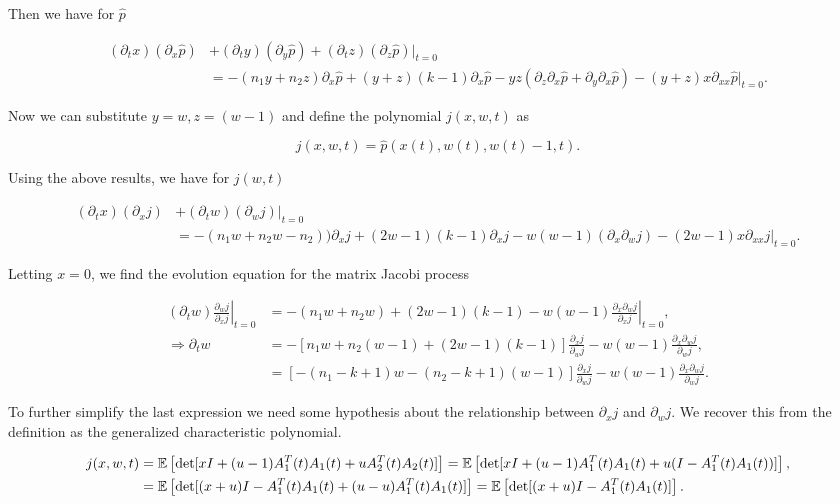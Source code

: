     Then we have for $\hat p$

    \begin{align*}
        (\partial_t x)(\partial_x \hat p) &+ (\partial_t y)(\partial_y \hat p) + (\partial_t z)(\partial_z \hat p)|_{t=0} \\ 
        &= -(n_1y + n_2 z)\partial_x \hat p + (y+z)(k-1)\partial_x \hat p - yz (\partial_z\partial_x \hat p + \partial_y\partial_x \hat p) - (y+z)x\partial_{xx} \hat p|_{t=0}.
    \end{align*}

    Now we can substitute $y = w, z = (w-1)$ and define the polynomial $j(x,w,t)$ as

    \begin{equation*}
        j(x,w,t) = \hat p(x(t), w(t), w(t)-1, t).
    \end{equation*}

    Using the above results, we have for $j(w,t)$

    \begin{align*}
        (\partial_t x)(\partial_x j) &+ (\partial_t w)(\partial_w j)|_{t=0} \\
        &= -(n_1w + n_2w-n_2))\partial_x j + (2w-1)(k-1)\partial_x j - w(w-1)(\partial_x\partial_w j) - (2w-1)x\partial_{xx} j|_{t=0}.
    \end{align*}

    Letting $x=0$, we find the evolution equation for the matrix Jacobi process

    \begin{align*}
        \left.(\partial_t w)\frac{\partial_w j}{\partial_x j}\right|_{t=0} &= \left.-(n_1w + n_2w) + (2w-1)(k-1) - w(w-1)\frac{\partial_x\partial_w j}{\partial_x j}\right|_{t=0},\\
        \Rightarrow \partial_t w &= -[n_1w + n_2 (w-1) +(2w-1)(k-1)]\frac{\partial_x j}{\partial_w j} - w(w-1)\frac{\partial_x\partial_w j}{\partial_w j},\\ 
        &= [-(n_1-k+1)w - (n_2 -k+1)(w-1)]\frac{\partial_x j}{\partial_w j} - w(w-1)\frac{\partial_x\partial_w j}{\partial_w j}.
    \end{align*}

    To further simplify the last expression we need some hypothesis about the relationship between $\partial_x j$ and $\partial_w j$. We recover this from the definition as the generalized characteristic polynomial.

    \begin{align*}
        j(x,w,t) &= \mathbb E \left[  \det[ xI + (u-1)A^T_1(t) A_1(t) + u A^T_2(t) A_2(t) ]  \right] = \mathbb E \left[  \det[ xI + (u-1)A^T_1(t) A_1(t) + u (I - A^T_1(t) A_1(t)) ]  \right], \\
        &= \mathbb E \left[  \det[ (x+u)I - A^T_1(t) A_1(t) +(u-u)A^T_1(t) A_1(t) ]  \right] = \mathbb E \left[  \det[ (x+u)I - A^T_1(t) A_1(t)]  \right].
    \end{align*}

